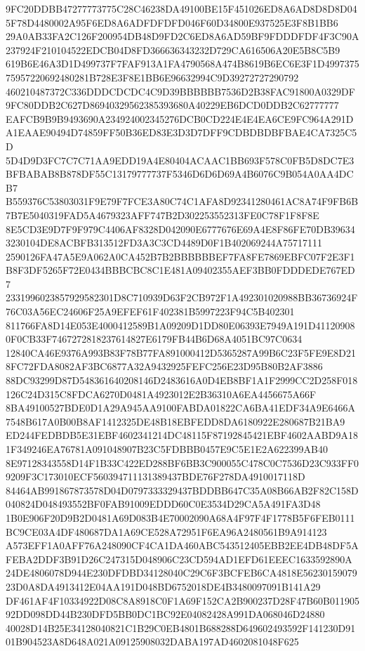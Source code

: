 \documentclass[UTF8,fontset=fandol,zihao=-4,a4paper]{ctexart}
\begin{document}
{{9FC20DDBB47277773775C28C46238DA49100BE15F451026ED8A6AD8D8D8D045F78D4480002A95F6ED8A6ADFDFDFD046F60D34800E937525E3F8B1BB6
29A0AB33FA2C126F200954DB48D9FD2C6ED8A6AD59BF9FDDDFDF4F3C90A237924F210104522EDCB04D8FD366636343232D729CA616506A20E5B8C5B9
619B6E46A3D1D499737F7FAF913A1FA4790568A474B8619B6EC6E3F1D499737575957220692480281B728E3F8E1BB6E96632994C9D39272727290792
460210487372C336DDDCDCDC4C9D39BBBBBB7536D2B38FAC91800A0329DF9FC80DDB2C627D86940329562385393680A40229EB6DCD0DDB2C62777777
EAFCB9B9B9493690A234924002345276DCB0CD224E4E4EA6CE9FC964A291DA1EAAE90494D74859FF50B36ED83E3D3D7DFF9CDBDBDBFBAE4CA7325C5D
5D4D9D3FC7C7C71AA9EDD19A4E80404ACAAC1BB693F578C0FB5D8DC7E3BFBABAB8B878DF55C13179777737F5346D6D6D69A4B6076C9B054A0AA4DCB7
B559376C53803031F9E79F7FCE3A80C74C1AFA8D92341280461AC8A74F9FB6B7B7E5040319FAD5A4679323AFF747B2D302253552313FE0C78F1F8F8E
8E5CD3E9D7F9F979C4406AF8328D042090E6777676E69A4E8F86FE70DB396343230104DE8ACBFB313512FD3A3C3CD4489D0F1B402069244A75717111
2590126FA47A5E9A062A0CA452B7B2BBBBBBEF7FA8FE7869EBFC07F2E3F1B8F3DF5265F72E0434BBBCBC8C1E481A09402355AEF3BB0FDDDEDE767ED7
2331996023857929582301D8C710939D63F2CB972F1A492301020988BB36736924F76C03A56EC24606F25A9EFEF61F402381B5997223F94C5B402301
811766FA8D14E053E4000412589B1A09209D1DD80E06393E7949A191D411209080F0CB33F7467272818237614827E6179FB44B6D68A4051BC97C0634
12840CA46E9376A993B83F78B77FA891000412D5365287A99B6C23F5FE9E8D218FC72FDA8082AF3BC6877A32A9432925FEFC256E23D95B80B2AF3886
88DC93299D87D548361640208146D2483616A0D4EB8BF1A1F2999CC2D258F018126C24D315C8FDCA6270D0481A4923012E2B36310A6EA4456675A66F
8BA49100527BDE0D1A29A945AA9100FABDA01822CA6BA41EDF34A9E6466A7548B617A0B00B8AF1412325DE48B18EBFEDD8DA6180922E280687B21BA9
ED244FEDBDB5E31EBF4602341214DC48115F87192845421EBF4602AABD9A181F349246EA76781A091048907B23C5FDBBB0457E9C5E1E2A622399AB40
8E97128343558D14F1B33C422ED288BF6BB3C900055C478C0C7536D23C933FF09209F3C173010ECF560394711131389437BDE76F278DA4910017118D
84464AB991867873578D04D0797333329437BDDBB647C35A08B66AB2F82C158D040824D048493552BF0FAB91009EDDD60C0E3534D29CA5A491FA3D48
1B0E906F20D9B2D0481A69D083B4E70002090A68A4F97F4F1778B5F6FEB0111BC9CE03A4DF480687DA1A69CE528A72951F6EA96A2480561B9A914123
A573EFF1A0AFF76A248090CF4CA1DA460ABC543512405EBB2EE4DB48DF5AFEBA2DDF3B91D26C247315D048906C23CD594AD1EFD61EEEC1633592890A
24DE4806078D944E230DFDBD34128040C29C6F3BCFEB6CA4818E5623015907923D0A8DA4913412E04AA191D048BD6752018DE4B3480097091B141A29
DF461AF4F10334922D08C8A8918C0F1A69F152CA2B900237D28F47B60B01190592DD098DD44B230DFD5BB0DC1BC92E04082428A991DA068046D24880
40028D14B25E34128040821C1B29C0EB4801B688288D649602493592F141230D9101B904523A8D648A021A09125908032DABA197AD4602081048F625
}}
\end{document}

